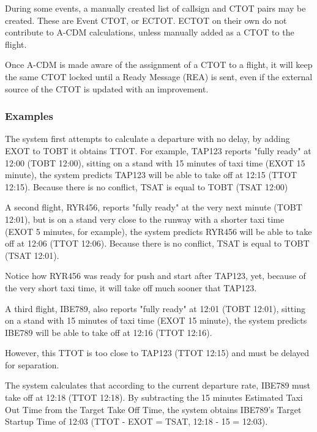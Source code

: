 \documentclass[a4paper,oneside,11pt]{memoir}
\begin{document}
\medskip

During some events, a manually created list of callsign and CTOT pairs may be created. These are Event CTOT, or ECTOT. ECTOT on their own do not contribute to A-CDM calculations, unless manually added as a CTOT to the flight.

\medskip

Once A-CDM is made aware of the assignment of a CTOT to a flight, it will keep the same CTOT locked until a Ready Message (REA) is sent, even if the external source of the CTOT is updated with an improvement. 

\subsubsection{Examples}

The system first attempts to calculate a departure with no delay, by adding EXOT to TOBT it obtains TTOT. For example, TAP123 reports "fully ready" at 12:00 (TOBT 12:00), sitting on a stand with 15 minutes of taxi time (EXOT 15 minute), the system predicts TAP123 will be able to take off at 12:15 (TTOT 12:15). Because there is no conflict, TSAT is equal to TOBT (TSAT 12:00)

\bigskip

A second flight, RYR456, reports "fully ready" at the very next minute (TOBT 12:01), but is on a stand very close to the runway with a shorter taxi time (EXOT 5 minutes, for example), the system predicts RYR456 will be able to take off at 12:06 (TTOT 12:06). Because there is no conflict, TSAT is equal to TOBT (TSAT 12:01).

Notice how RYR456 was ready for push and start after TAP123, yet, because of the very short taxi time, it will take off much sooner that TAP123.

\bigskip

A third flight, IBE789, also reports "fully ready" at 12:01 (TOBT 12:01), sitting on a stand with 15 minutes of taxi time (EXOT 15 minute), the system predicts IBE789 will be able to take off at 12:16 (TTOT 12:16). 

However, this TTOT is too close to TAP123 (TTOT 12:15) and must be delayed for separation. 

The system calculates that according to the current departure rate, IBE789 must take off at 12:18 (TTOT 12:18). By subtracting the 15 minutes Estimated Taxi Out Time from the Target Take Off Time, the system obtains IBE789's Target Startup Time of 12:03 (TTOT - EXOT = TSAT, 12:18 - 15 = 12:03).
\end{document}
